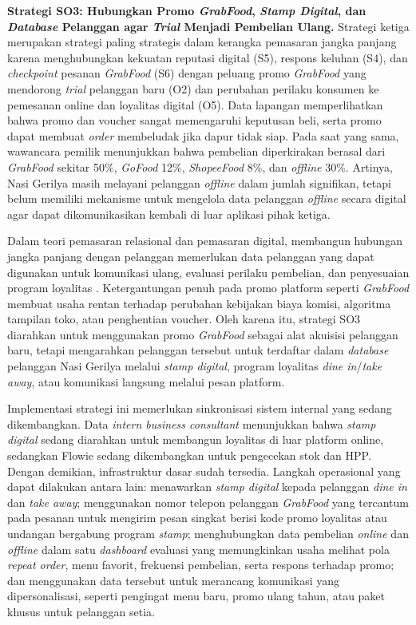 \textbf{Strategi SO3: Hubungkan Promo \textit{GrabFood}, \textit{Stamp Digital}, dan \textit{Database} Pelanggan agar \textit{Trial} Menjadi Pembelian Ulang.} Strategi ketiga merupakan strategi paling strategis dalam kerangka pemasaran jangka panjang karena menghubungkan kekuatan reputasi digital (S5), respons keluhan (S4), dan \textit{checkpoint} pesanan \textit{GrabFood} (S6) dengan peluang promo \textit{GrabFood} yang mendorong \textit{trial} pelanggan baru (O2) dan perubahan perilaku konsumen ke pemesanan online dan loyalitas digital (O5). Data lapangan memperlihatkan bahwa promo dan voucher sangat memengaruhi keputusan beli, serta promo dapat membuat \textit{order} membeludak jika dapur tidak siap. Pada saat yang sama, wawancara pemilik menunjukkan bahwa pembelian diperkirakan berasal dari \textit{GrabFood} sekitar 50\%, \textit{GoFood} 12\%, \textit{ShopeeFood} 8\%, dan \textit{offline} 30\%. Artinya, Nasi Gerilya masih melayani pelanggan \textit{offline} dalam jumlah signifikan, tetapi belum memiliki mekanisme untuk mengelola data pelanggan \textit{offline} secara digital agar dapat dikomunikasikan kembali di luar aplikasi pihak ketiga.

Dalam teori pemasaran relasional dan pemasaran digital, membangun hubungan jangka panjang dengan pelanggan memerlukan data pelanggan yang dapat digunakan untuk komunikasi ulang, evaluasi perilaku pembelian, dan penyesuaian program loyalitas \parencite{kotler2021marketingmanagement,chaffey2022digitalmarketing}. Ketergantungan penuh pada promo platform seperti \textit{GrabFood} membuat usaha rentan terhadap perubahan kebijakan biaya komisi, algoritma tampilan toko, atau penghentian voucher. Oleh karena itu, strategi SO3 diarahkan untuk menggunakan promo \textit{GrabFood} sebagai alat akuisisi pelanggan baru, tetapi mengarahkan pelanggan tersebut untuk terdaftar dalam \textit{database} pelanggan Nasi Gerilya melalui \textit{stamp digital}, program loyalitas \textit{dine in}/\textit{take away}, atau komunikasi langsung melalui pesan platform.

Implementasi strategi ini memerlukan sinkronisasi sistem internal yang sedang dikembangkan. Data \textit{intern business consultant} menunjukkan bahwa \textit{stamp digital} sedang diarahkan untuk membangun loyalitas di luar platform online, sedangkan Flowie sedang dikembangkan untuk pengecekan stok dan HPP. Dengan demikian, infrastruktur dasar sudah tersedia. Langkah operasional yang dapat dilakukan antara lain: menawarkan \textit{stamp digital} kepada pelanggan \textit{dine in} dan \textit{take away}; menggunakan nomor telepon pelanggan \textit{GrabFood} yang tercantum pada pesanan untuk mengirim pesan singkat berisi kode promo loyalitas atau undangan bergabung program \textit{stamp}; menghubungkan data pembelian \textit{online} dan \textit{offline} dalam satu \textit{dashboard} evaluasi yang memungkinkan usaha melihat pola \textit{repeat order}, menu favorit, frekuensi pembelian, serta respons terhadap promo; dan menggunakan data tersebut untuk merancang komunikasi yang dipersonalisasi, seperti pengingat menu baru, promo ulang tahun, atau paket khusus untuk pelanggan setia.

